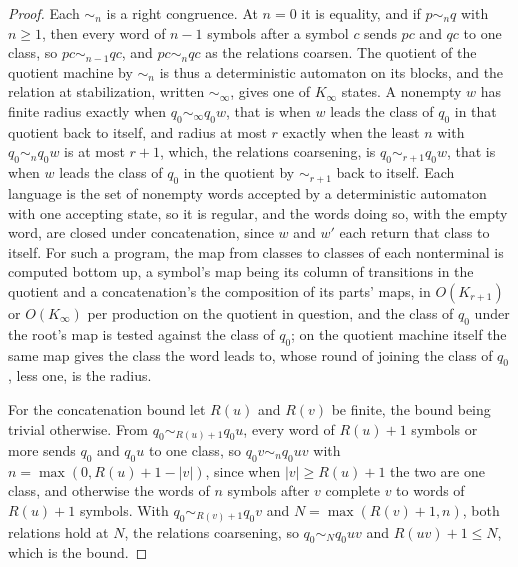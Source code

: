 \documentclass[11pt,a4paper]{article}
\theoremstyle{definition}
\theoremstyle{plain}
\begin{document}
\begin{proof}
Each \(\sim_n\) is a right congruence. At \(n = 0\) it is equality, and if \(p \sim_n q\) with \(n \ge 1\), then every
word of \(n - 1\) symbols after a symbol \(c\) sends \(pc\) and \(qc\) to one class, so \(pc \sim_{n-1} qc\), and
\(pc \sim_n qc\) as the relations coarsen. The quotient of the quotient machine by \(\sim_n\) is thus a deterministic
automaton on its blocks, and the relation at stabilization, written \(\sim_\infty\), gives one of \(K_\infty\) states. A
nonempty \(w\) has finite radius exactly when \(q_0 \sim_\infty q_0 w\), that is when \(w\) leads the class of \(q_0\)
in that quotient back to itself, and radius at most \(r\) exactly when the least \(n\) with \(q_0 \sim_n q_0 w\) is at
most \(r + 1\), which, the relations coarsening, is \(q_0 \sim_{r+1} q_0 w\), that is when \(w\) leads the class of
\(q_0\) in the quotient by \(\sim_{r+1}\) back to itself. Each language is the set of nonempty words accepted by a
deterministic automaton with one accepting state, so it is regular, and the words doing so, with the empty word, are
closed under concatenation, since \(w\) and \(w'\) each return that class to itself. For such a program, the map from
classes to classes of each nonterminal is computed bottom up, a symbol's map being its column of transitions in the
quotient and a concatenation's the composition of its parts' maps, in \(O(K_{r+1})\) or \(O(K_\infty)\) per production
on the quotient in question, and the class of \(q_0\) under the root's map is tested against the class of \(q_0\); on
the quotient machine itself the same map gives the class the word leads to, whose round of joining the class of \(q_0\),
less one, is the radius.

For the concatenation bound let \(R(u)\) and \(R(v)\) be finite, the bound being trivial otherwise. From
\(q_0 \sim_{R(u)+1} q_0 u\), every word of \(R(u) + 1\) symbols or more sends \(q_0\) and \(q_0 u\) to one class, so
\(q_0 v \sim_n q_0 uv\) with \(n = \max(0, R(u) + 1 - |v|)\), since when \(|v| \ge R(u) + 1\) the two are one class, and
otherwise the words of \(n\) symbols after \(v\) complete \(v\) to words of \(R(u) + 1\) symbols. With
\(q_0 \sim_{R(v)+1} q_0 v\) and \(N = \max(R(v) + 1, n)\), both relations hold at \(N\), the relations coarsening, so
\(q_0 \sim_N q_0 uv\) and \(R(uv) + 1 \le N\), which is the bound.


\end{proof}
\end{document}
